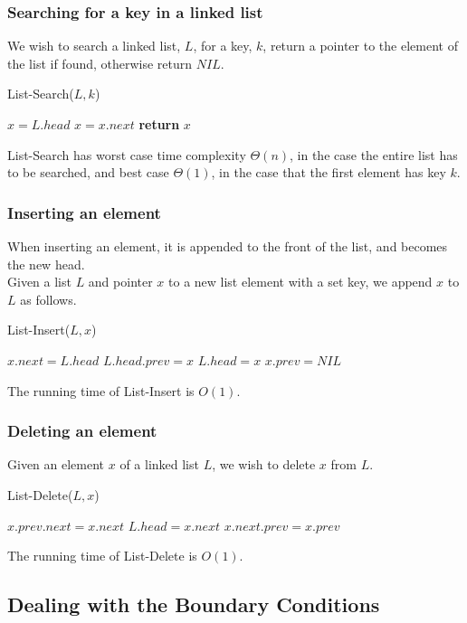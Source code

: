 \documentclass[11pt]{report}
\begin{document}
\subsubsection{Searching for a key in a linked list}
We wish to search a linked list, $L$, for a key, $k$, return a pointer to the element of the list if found, otherwise return $NIL$. \mypar
\begin{algorithm}
    [H]
    \caption{List-Search($L,k$)}
    $x = L.head$\;
    {$x = x.next$\;}
    \textbf{return }$x$\;
\end{algorithm}
\mypar
List-Search has worst case time complexity $\Theta(n)$, in the case the entire list has to be searched, and best case $\Theta(1)$, in the case that the first element has key $k$.
\subsubsection{Inserting an element}
When inserting an element, it is appended to the front of the list, and becomes the new head. \\ Given a list $L$ and pointer $x$ to a new list element with a set key, we append $x$ to $L$ as follows.
\mypar
\begin{algorithm}
    [H]
    \caption{List-Insert($L,x$)}
    $x.next = L.head$\;
    {$L.head.prev = x$\;}
    $L.head = x$\;
    $x.prev = NIL$\;
\end{algorithm} \mypar
The running time of List-Insert is $O(1)$.
\pagebreak
\subsubsection{Deleting an element}
Given an element $x$ of a linked list $L$, we wish to delete $x$ from $L$.
\mypar
\begin{algorithm}
    [H]
    \caption{List-Delete($L,x$)}
    {$x.prev.next = x.next$\;}
    \Else 
    {$L.head = x.next$\;}
    {$x.next.prev = x.prev$\;}
\end{algorithm}
\mypar
The running time of List-Delete is $O(1)$.
\subsection{Dealing with the Boundary Conditions}
\end{document}
